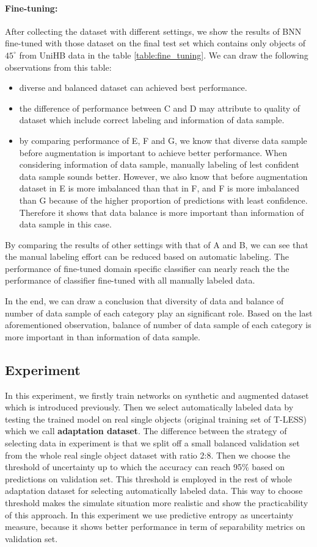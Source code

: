 \paragraph{Fine-tuning:} After collecting the dataset with different settings, we show the results of BNN fine-tuned with those dataset on the final test set which contains only objects of $45^{\circ}$ from UniHB data in the table \ref{table:fine_tuning}. We can draw the following observations from this table:
\begin{itemize}
	\item diverse and balanced dataset can achieved best performance.
	\item the difference of performance between C and D may attribute to quality of dataset which include correct labeling and information of data sample.
	\item by comparing performance of E, F and G, we know that diverse data sample before augmentation is important to achieve better performance. When considering information of data sample, manually labeling of lest confident data sample sounds better. However, we also know that before augmentation dataset in E is more imbalanced than that in F, and F is more imbalanced than G because of the higher proportion of predictions with least confidence. Therefore it shows that data balance is more important than information of data sample in this case.
\end{itemize}
By comparing the results of other settings with that of A and B, we can see that the manual labeling effort can be reduced based on automatic labeling.  The performance of fine-tuned domain specific classifier can nearly reach the the performance of classifier fine-tuned with all manually labeled data. 

In the end, we can draw a conclusion that diversity of data and balance of number of data sample of each category play an significant role. Based on the last aforementioned observation, balance of number of data sample of each category is more important in than information of data sample.

\subsection{Experiment }
In this experiment, we firstly train networks on synthetic and augmented dataset which is introduced previously. Then we select automatically labeled data by testing the trained model on real single objects (original training set of T-LESS) which we call \textbf{adaptation dataset}. The difference between the strategy of selecting data in experiment  is that we split off a small balanced validation set from the whole real single object dataset with ratio 2:8. Then we choose the threshold of uncertainty up to which the accuracy can reach 95\% based on predictions on validation set. This threshold is employed in the rest of whole adaptation dataset for selecting automatically labeled data. This way to choose threshold makes the simulate situation more realistic and show the practicability of this approach. In this experiment we use predictive entropy as uncertainty measure, because it shows better performance in term of separability metrics on validation set.

